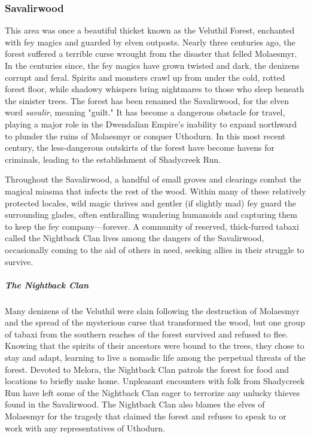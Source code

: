 \documentclass[10pt,a4paper,twoside,bg=print,twocolumn,openany,nodeprecatedcode]{dndbook}
\begin{document}
\subsubsection{Savalirwood}
This area was once a beautiful thicket known as the Veluthil Forest, enchanted with fey magics and guarded by elven outposts. Nearly three centuries ago, the forest suffered a terrible curse wrought from the disaster that felled Molaesmyr. In the centuries since, the fey magics have grown twisted and dark, the denizens corrupt and feral. Spirits and monsters crawl up from under the cold, rotted forest floor, while shadowy whispers bring nightmares to those who sleep beneath the sinister trees. The forest has been renamed the Savalirwood, for the elven word \textit{savalir}, meaning "guilt." It has become a dangerous obstacle for travel, playing a major role in the Dwendalian Empire's inability to expand northward to plunder the ruins of Molaesmyr or conquer Uthodurn. In this most recent century, the less-dangerous outskirts of the forest have become havens for criminals, leading to the establishment of Shadycreek Run.

Throughout the Savalirwood, a handful of small groves and clearings combat the magical miasma that infects the rest of the wood. Within many of these relatively protected locales, wild magic thrives and gentler (if slightly mad) fey guard the surrounding glades, often enthralling wandering humanoids and capturing them to keep the fey company—forever. A community of reserved, thick-furred tabaxi called the Nightback Clan lives among the dangers of the Savalirwood, occasionally coming to the aid of others in need, seeking allies in their struggle to survive.

\subparagraph{The Nightback Clan}
Many denizens of the Veluthil were slain following the destruction of Molaesmyr and the spread of the mysterious curse that transformed the wood, but one group of tabaxi from the southern reaches of the forest survived and refused to flee. Knowing that the spirits of their ancestors were bound to the trees, they chose to stay and adapt, learning to live a nomadic life among the perpetual threats of the forest. Devoted to Melora, the Nightback Clan patrols the forest for food and locations to briefly make home. Unpleasant encounters with folk from Shadycreek Run have left some of the Nightback Clan eager to terrorize any unlucky thieves found in the Savalirwood. The Nightback Clan also blames the elves of Molaesmyr for the tragedy that claimed the forest and refuses to speak to or work with any representatives of Uthodurn.
\end{document}
